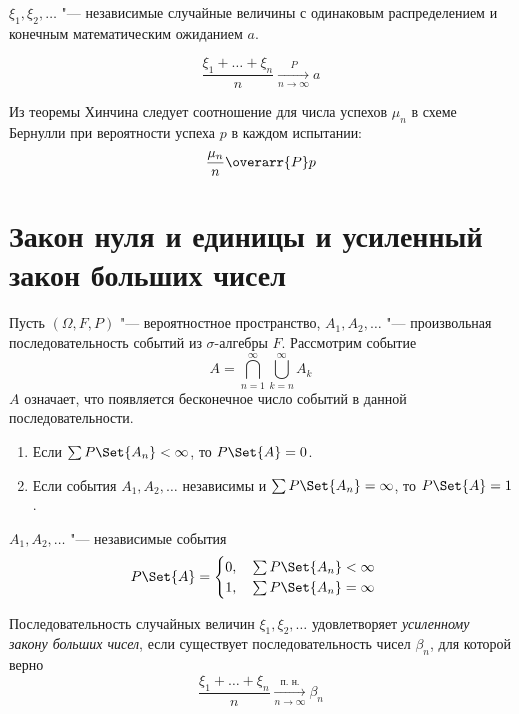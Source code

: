 \begin{theorem}[Хинчина]
    $ \xi_1, \xi_2, \dotsc $ "--- независимые случайные величины с одинаковым распределением
    и конечным математическим ожиданием $ a $.

    $$ \frac{\xi_1 + \dots + \xi_n}n \xrightarrow[n \to \infty]{P} a $$
\end{theorem}

\begin{remark}
    Из теоремы Хинчина следует соотношение для числа успехов $ \mu_n $ в схеме Бернулли при
    вероятности успеха $ p $ в каждом испытании:
    $$ \frac{\mu_n}n \overarr{P} p $$
\end{remark}

\section{Закон нуля и единицы и усиленный закон больших чисел}

Пусть $(\Omega, F, P) $ "--- вероятностное пространство, $ A_1, A_2, \dotsc $ "--- произвольная
последовательность событий из $ \sigma $-алгебры $ F $.
Рассмотрим событие
$$ A = \bigcap_{n = 1}^\infty \bigcup_{k = n}^\infty A_k $$
$ A $ означает, что появляется бесконечное число событий в данной последовательности.

\begin{lemma}
    \hfill
    \begin{enumerate}
        \item Если $ \sum P\Set{A_n} < \infty $, то $ P\Set{A} = 0 $.
        \item Если события $ A_1, A_2, \dotsc $ независимы и $ \sum P\Set{A_n} = \infty $, то
            $ P\Set{A} = 1 $.
    \end{enumerate}
\end{lemma}

\begin{theorem}
    $ A_1, A_2, \dotsc $ "--- независимые события
    $$ P\Set{A} =
    \begin{cases}
        0, \quad \sum P\Set{A_n} < \infty \\
        1, \quad \sum P\Set{A_n} = \infty
    \end{cases} $$
\end{theorem}

\begin{definition}
    Последовательность случайных величин $ \xi_1, \xi_2, \dotsc $ удовлетворяет \emph{усиленному
    закону больших чисел}, если существует последовательность чисел $ \beta_n $, для которой верно
    $$ \frac{\xi_1 + \dots + \xi_n}n \xrightarrow[n \to \infty]{\text{п. н.}} \beta_n $$
\end{definition}

